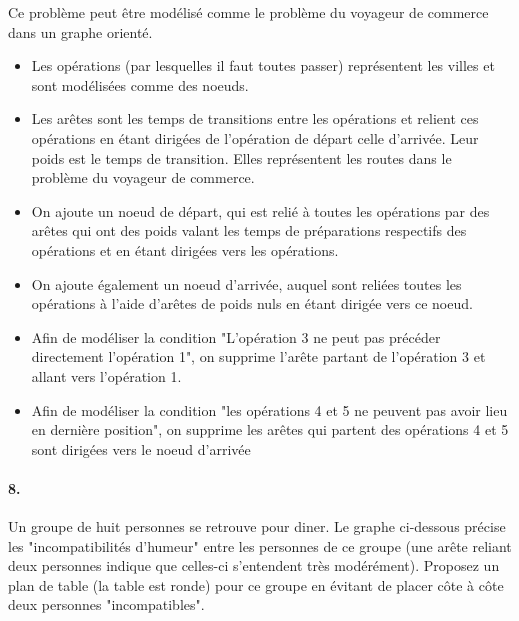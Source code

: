 \begin{solution}
Ce problème peut être modélisé comme le problème du voyageur de commerce dans un graphe orienté.
\begin{itemize}
\item Les opérations (par lesquelles il faut toutes passer) représentent les villes et sont modélisées comme des noeuds. 
\item Les arêtes sont les temps de transitions entre les opérations et relient ces opérations en étant dirigées de l'opération de départ  celle d'arrivée. Leur poids est le temps de transition. Elles représentent les routes dans le problème du voyageur de commerce.
\item On ajoute un noeud de départ, qui est relié à toutes les opérations par des arêtes qui ont des poids valant les temps de préparations respectifs des opérations et en étant dirigées vers les opérations. 
\item On ajoute également un noeud d'arrivée, auquel sont reliées toutes les opérations à l'aide d'arêtes de poids nuls en étant dirigée vers ce noeud.
\item Afin de modéliser la condition "L'opération 3 ne peut pas précéder directement l'opération 1", on supprime l'arête partant de l'opération 3 et allant vers l'opération 1.
\item Afin de modéliser la condition "les opérations 4 et 5 ne peuvent pas avoir lieu en dernière position", on supprime les arêtes qui partent des opérations 4 et 5 sont dirigées vers le noeud d'arrivée
\end{itemize}
\end{solution}

\paragraph{8. } Un groupe de huit personnes se retrouve pour diner. Le graphe ci-dessous précise les "incompatibilités d'humeur" entre les personnes de ce groupe (une arête reliant deux personnes indique que celles-ci s'entendent très modérément). Proposez un plan de table (la table est ronde) pour ce groupe en évitant de placer côte à côte deux personnes "incompatibles".

